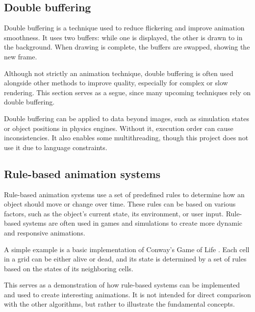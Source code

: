 \vspace{30pt}

\subsection{Double buffering}
\label{subsec:double-buffering}

Double buffering is a technique used to reduce flickering and improve animation smoothness. It uses two buffers: while one is displayed, the other is drawn to in the background. When drawing is complete, the buffers are swapped, showing the new frame.

Although not strictly an animation technique, double buffering is often used alongside other methods to improve quality, especially for complex or slow rendering. This section serves as a segue, since many upcoming techniques rely on double buffering.

\begin{Note}
    Double buffering can be applied to data beyond images, such as simulation states or object positions in physics engines. Without it, execution order can cause inconsistencies. It also enables some multithreading, though this project does not use it due to language constraints.
\end{Note}

\pagebreak

\subsection{Rule-based animation systems}
\label{subsec:rule-based-animation-systems}

Rule-based animation systems use a set of predefined rules to determine how an object should move or change over time. These rules can be based on various factors, such as the object's current state, its environment, or user input. Rule-based systems are often used in games and simulations to create more dynamic and responsive animations.

A simple example is a basic implementation of Conway's Game of Life \cite{conway}. Each cell in a grid can be either alive or dead, and its state is determined by a set of rules based on the states of its neighboring cells.


This serves as a demonstration of how rule-based systems can be implemented and used to create interesting animations. It is not intended for direct comparison with the other algorithms, but rather to illustrate the fundamental concepts.

